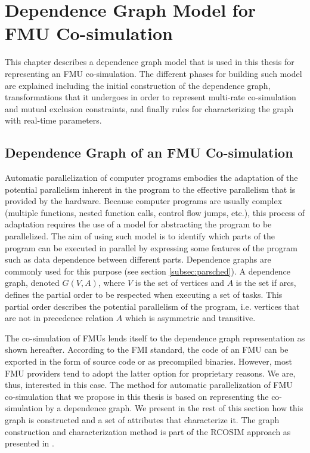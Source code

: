 \chapter{\label{ch:4-accel}Dependence Graph Model for FMU Co-simulation}

\minitoc

This chapter describes a dependence graph model that is used in this thesis for representing an FMU co-simulation. The different phases for building such model are explained including the initial construction of the dependence graph, transformations that it undergoes in order to represent multi-rate co-simulation and mutual exclusion constraints, and finally rules for characterizing the graph with real-time parameters.
 
\section{\label{sec:4-depgrph}Dependence Graph of an FMU Co-simulation}

Automatic parallelization of computer programs embodies the adaptation of the potential parallelism inherent in the program to the effective parallelism that is provided by the hardware. Because computer programs are usually complex (multiple functions, nested function calls, control flow jumps, etc.), this process of adaptation requires the use of a model for abstracting the program to be parallelized. The aim of using such model is to identify which parts of the program can be executed in parallel by expressing some features of the program such as data dependence between different parts. Dependence graphs are commonly used for this purpose (see section \ref{subsec:parsched}). A dependence graph, denoted $G(V,A)$, where $V$ is the set of vertices and $A$ is the set if arcs, defines the partial order to be respected when executing a set of tasks. This partial order describes the potential parallelism of the program, i.e. vertices that are not in precedence relation $A$ which is asymmetric and transitive. %

The co-simulation of FMUs lends itself to the dependence graph representation as shown hereafter. According to the FMI standard, the code of an FMU can be exported in the form of source code or as precompiled binaries. However, most FMU providers tend to adopt the latter option for proprietary reasons. We are, thus, interested in this case. The method for automatic parallelization of FMU co-simulation that we propose in this thesis is based on representing the co-simulation by a dependence graph. We present in the rest of this section how this graph is constructed and a set of attributes that characterize it. The graph construction and characterization method is part of the RCOSIM approach as presented in \cite{benkhaled:2014}.

